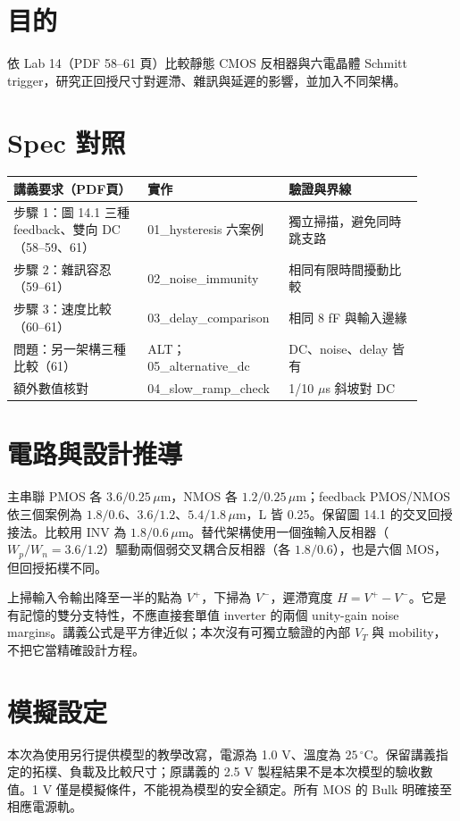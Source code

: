 \section{目的}
依 Lab 14（PDF 58--61 頁）比較靜態 CMOS 反相器與六電晶體 Schmitt trigger，研究正回授尺寸對遲滯、雜訊與延遲的影響，並加入不同架構。

\section{Spec 對照}
\begin{longtable}{p{0.31\linewidth}p{0.29\linewidth}p{0.31\linewidth}}
\toprule
講義要求（PDF頁） & 實作 & 驗證與界線 \\\midrule
步驟 1：圖 14.1 三種 feedback、雙向 DC（58--59、61） & 01\_hysteresis 六案例 & 獨立掃描，避免同時跳支路 \\
步驟 2：雜訊容忍（59--61） & 02\_noise\_immunity & 相同有限時間擾動比較 \\
步驟 3：速度比較（60--61） & 03\_delay\_comparison & 相同 8 fF 與輸入邊緣 \\
問題：另一架構三種比較（61） & ALT；05\_alternative\_dc & DC、noise、delay 皆有 \\
額外數值核對 & 04\_slow\_ramp\_check & 1/10 $\mu$s 斜坡對 DC \\
\bottomrule
\end{longtable}


\section{電路與設計推導}
主串聯 PMOS 各 $3.6/0.25\,\mu$m，NMOS 各 $1.2/0.25\,\mu$m；feedback PMOS/NMOS 依三個案例為 $1.8/0.6$、$3.6/1.2$、$5.4/1.8\,\mu$m，L 皆 0.25。保留圖 14.1 的交叉回授接法。比較用 INV 為 $1.8/0.6\,\mu$m。替代架構使用一個強輸入反相器（$W_p/W_n=3.6/1.2$）驅動兩個弱交叉耦合反相器（各 $1.8/0.6$），也是六個 MOS，但回授拓樸不同。

上掃輸入令輸出降至一半的點為 $V^+$，下掃為 $V^-$，遲滯寬度 $H=V^+-V^-$。它是有記憶的雙分支特性，不應直接套單值 inverter 的兩個 unity-gain noise margins。講義公式是平方律近似；本次沒有可獨立驗證的內部 $V_T$ 與 mobility，不把它當精確設計方程。

\section{模擬設定}
本次為使用另行提供模型的教學改寫，電源為 1.0 V、溫度為 $25\,^{\circ}\mathrm C$。保留講義指定的拓樸、負載及比較尺寸；原講義的 2.5 V 製程結果不是本次模型的驗收數值。1 V 僅是模擬條件，不能視為模型的安全額定。所有 MOS 的 Bulk 明確接至相應電源軌。

